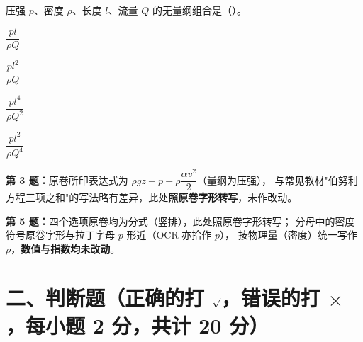 \begin{ti}
  \item 压强 $p$、密度 $\rho$、长度 $l$、流量 $Q$ 的无量纲组合是（\quad）。
  \hfill{}
  \begin{choices}
    \item $\dfrac{pl}{\rho Q}$
    \item $\dfrac{pl^{2}}{\rho Q}$
    \item $\dfrac{pl^{4}}{\rho Q^{2}}$
    \item $\dfrac{pl^{2}}{\rho Q^{4}}$
  \end{choices}
\end{ti}

\begin{tishi}
\textbf{第 3 题：}原卷所印表达式为 $\rho g z+p+\rho\dfrac{\alpha v^{2}}{2}$（量纲为压强），
与常见教材"伯努利方程三项之和"的写法略有差异，此处\textbf{照原卷字形转写}，未作改动。

\textbf{第 5 题：}四个选项原卷均为分式（竖排），此处照原卷字形转写；
分母中的密度符号原卷字形与拉丁字母 $p$ 形近（OCR 亦拾作 $p$），
按物理量（密度）统一写作 $\rho$，\textbf{数值与指数均未改动}。
\end{tishi}

\section{二、判断题（正确的打 $\surd$，错误的打 $\times$，每小题 2 分，共计 20 分）}


